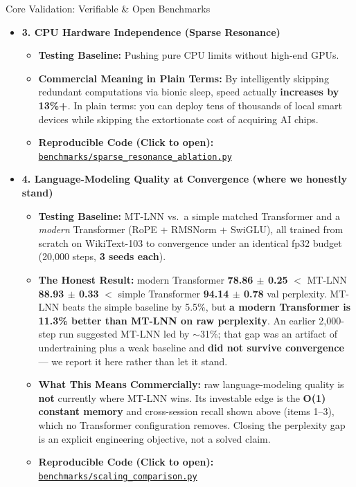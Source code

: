 ﻿\documentclass[aspectratio=169, 10pt]{beamer}
\begin{document}
\begin{frame}[allowframebreaks]{Core Validation: Verifiable \& Open Benchmarks}
\begin{itemize}
\begin{itemize}
        \item \textbf{Reproducible Code (Click to open):} \href{https://github.com/everest-an/M1/blob/main/benchmarks/run_benchmark.py}{\texttt{benchmarks/run\_benchmark.py}}
    \end{itemize}
    \vspace{0.2em}
    \item \textbf{3. CPU Hardware Independence (Sparse Resonance)}
    \begin{itemize}
        \item \textbf{Testing Baseline:} Pushing pure CPU limits without high-end GPUs.
        \item \textbf{Commercial Meaning in Plain Terms:} By intelligently skipping redundant computations via bionic sleep, speed actually \textbf{increases by 13\%+}. In plain terms: you can deploy tens of thousands of local smart devices while skipping the extortionate cost of acquiring AI chips.
        \item \textbf{Reproducible Code (Click to open):} \href{https://github.com/everest-an/M1/blob/main/benchmarks/sparse_resonance_ablation.py}{\texttt{benchmarks/sparse\_resonance\_ablation.py}}
    \end{itemize}
    \vspace{0.4em}
    \item \textbf{4. Language-Modeling Quality at Convergence (where we honestly stand)}
    \begin{itemize}
        \item \textbf{Testing Baseline:} MT-LNN vs.\ a simple matched Transformer and a \emph{modern} Transformer (RoPE + RMSNorm + SwiGLU), all trained from scratch on WikiText-103 to convergence under an identical fp32 budget (20,000 steps, \textbf{3 seeds each}).
        \item \textbf{The Honest Result:} modern Transformer \textbf{78.86 $\pm$ 0.25} $<$ MT-LNN \textbf{88.93 $\pm$ 0.33} $<$ simple Transformer \textbf{94.14 $\pm$ 0.78} val perplexity. MT-LNN beats the simple baseline by 5.5\%, but \textbf{a modern Transformer is 11.3\% better than MT-LNN on raw perplexity}. An earlier 2,000-step run suggested MT-LNN led by $\sim$31\%; that gap was an artifact of undertraining plus a weak baseline and \textbf{did not survive convergence} --- we report it here rather than let it stand.
        \item \textbf{What This Means Commercially:} raw language-modeling quality is \textbf{not} currently where MT-LNN wins. Its investable edge is the \textbf{O(1) constant memory} and cross-session recall shown above (items 1--3), which no Transformer configuration removes. Closing the perplexity gap is an explicit engineering objective, not a solved claim.
        \item \textbf{Reproducible Code (Click to open):} \href{https://github.com/everest-an/M1/blob/main/benchmarks/scaling_comparison.py}{\texttt{benchmarks/scaling\_comparison.py}}
    \end{itemize}
\end{itemize}
\end{frame}
\end{document}
